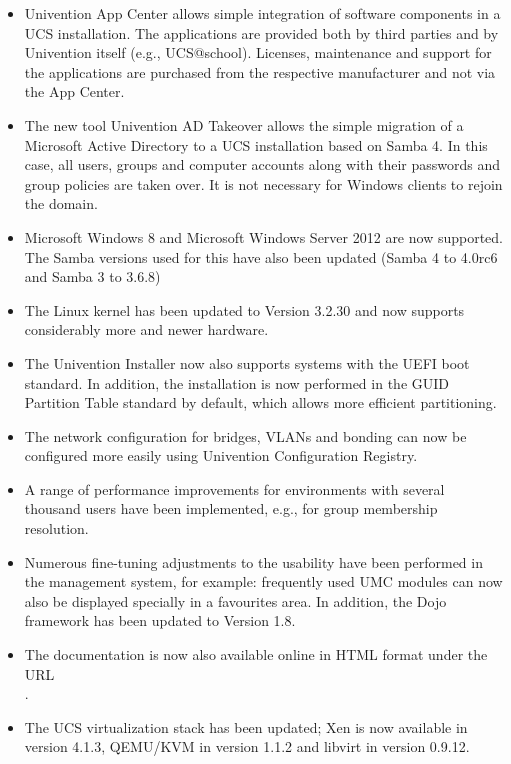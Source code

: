\begin{itemize}
\item Univention App Center allows simple integration of software
components in a UCS installation. The applications are provided both
by third parties and by Univention itself (e.g.,
UCS@school). Licenses, maintenance and support for the applications are
purchased from the respective manufacturer and not via the App Center.

\item The new tool Univention AD Takeover allows the simple migration
of a Microsoft Active Directory to a UCS installation based
on Samba 4. In this case, all users, groups and computer accounts
along with their passwords and group policies are taken over. It is
not necessary for Windows clients to rejoin the domain.

\item Microsoft Windows 8 and Microsoft Windows Server 2012 are now
supported. The Samba versions used for this have also been updated
(Samba 4 to 4.0rc6 and Samba 3 to 3.6.8)

\item The Linux kernel has been updated to Version 3.2.30 and now
supports considerably more and newer hardware.

\item The Univention Installer now also supports systems with the UEFI
boot standard. In addition, the installation is now performed in the
GUID Partition Table standard by default, which allows more efficient
partitioning.

\item The network configuration for bridges, VLANs and bonding can now
be configured more easily using Univention Configuration
Registry.

\item A range of performance improvements for environments with several
thousand users have been implemented, e.g., for group membership resolution.

\item Numerous fine-tuning adjustments to the usability have been
performed in the management system, for example: frequently used UMC
modules can now also be displayed specially in a favourites area. In
addition, the Dojo framework has been updated to Version 1.8.

\item The documentation is now also available online in HTML format
under the URL \\ .

\item The UCS virtualization stack has been updated; Xen is now
available in version 4.1.3, QEMU/KVM in version 1.1.2 and libvirt in
version 0.9.12.

\end{itemize}

